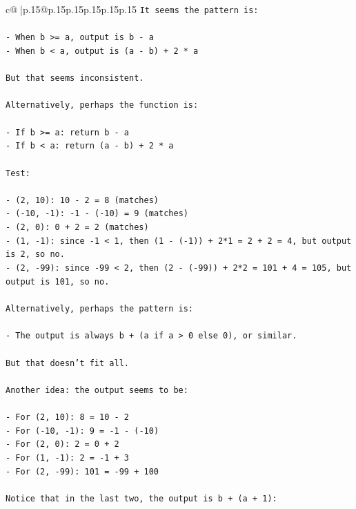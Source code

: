 \documentclass{article}
\begin{document}
{\begin{supertabular}{c@{$\;$}|p{.15\linewidth}@{}p{.15\linewidth}p{.15\linewidth}p{.15\linewidth}p{.15\linewidth}p{.15\linewidth}}
{{{\texttt{It seems the pattern is:} \\
\\ 
\texttt{{-} When b >= a, output is b {-} a} \\
\texttt{{-} When b < a, output is (a {-} b) + 2 * a} \\
\\ 
\texttt{But that seems inconsistent.} \\
\\ 
\texttt{Alternatively, perhaps the function is:} \\
\\ 
\texttt{{-} If b >= a: return b {-} a} \\
\texttt{{-} If b < a: return (a {-} b) + 2 * a} \\
\\ 
\texttt{Test:} \\
\\ 
\texttt{{-} (2, 10): 10 {-} 2 = 8 (matches)} \\
\texttt{{-} ({-}10, {-}1): {-}1 {-} ({-}10) = 9 (matches)} \\
\texttt{{-} (2, 0): 0 + 2 = 2 (matches)} \\
\texttt{{-} (1, {-}1): since {-}1 < 1, then (1 {-} ({-}1)) + 2*1 = 2 + 2 = 4, but output is 2, so no.} \\
\texttt{{-} (2, {-}99): since {-}99 < 2, then (2 {-} ({-}99)) + 2*2 = 101 + 4 = 105, but output is 101, so no.} \\
\\ 
\texttt{Alternatively, perhaps the pattern is:} \\
\\ 
\texttt{{-} The output is always b + (a if a > 0 else 0), or similar.} \\
\\ 
\texttt{But that doesn't fit all.} \\
\\ 
\texttt{Another idea: the output seems to be:} \\
\\ 
\texttt{{-} For (2, 10): 8 = 10 {-} 2} \\
\texttt{{-} For ({-}10, {-}1): 9 = {-}1 {-} ({-}10)} \\
\texttt{{-} For (2, 0): 2 = 0 + 2} \\
\texttt{{-} For (1, {-}1): 2 = {-}1 + 3} \\
\texttt{{-} For (2, {-}99): 101 = {-}99 + 100} \\
\\ 
\texttt{Notice that in the last two, the output is b + (a + 1):} \\
}}}
\end{supertabular}}
\end{document}
